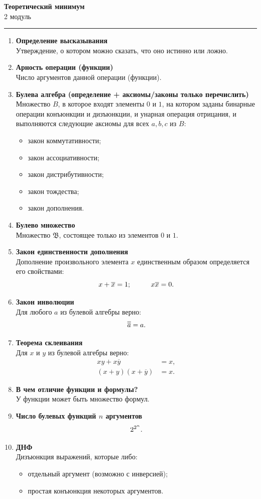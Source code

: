 \documentclass[a4paper,12pt,oneside]{article}
\newcommand{\bb}{\mathfrak{B}}
\newcommand{\NOT}[1]{\overline{#1}}
\newcommand{\BigDisp}[1]{%
\[
{\Large\displaystyle #1}
\]
}
\newcommand{\DefItem}[2]{\item \textbf{#1}\\#2}
\begin{document}
\begin{center}
    {\Large\bfseries Теоретический минимум}\\[2mm]
    {\normalsize 2 модуль \hfill}
\end{center}
\vspace{2mm}
\hrule
\vspace{4mm}

\begin{enumerate}[label=\arabic*.]

\DefItem{Определение высказывания}{Утверждение, о котором можно сказать, что оно истинно или ложно.}

\DefItem{Арность операции (функции)}{Число аргументов данной операции (функции).}

\DefItem{Булева алгебра (определение + аксиомы/законы только перечислить)}{Множество $B$, в которое входят элементы $0$ и $1$, на котором заданы бинарные операции конъюнкции и дизъюнкции, и унарная операция отрицания, и выполняются следующие аксиомы для всех $a,b,c$ из $B$:
\begin{itemize}
\item закон коммутативности;
\item закон ассоциативности;
\item закон дистрибутивности;
\item закон тождества;
\item закон дополнения.
\end{itemize}}

\DefItem{Булево множество}{Множество $\bb$, состоящее только из элементов $0$ и $1$.}

\DefItem{Закон единственности дополнения}{Дополнение произвольного элемента $x$ единственным образом определяется его свойствами:
\BigDisp{x+\NOT{x}=1;\qquad x\NOT{x}=0.}}

\DefItem{Закон инволюции}{Для любого $a$ из булевой алгебры верно:
\BigDisp{\NOT{\NOT{a}}=a.}}

\DefItem{Теорема склеивания}{Для $x$ и $y$ из булевой алгебры верно:
\[
\begin{aligned}
xy + x\overline{y} &= x,\\
(x+y)(x+\overline{y}) &= x.
\end{aligned}
\]}

\DefItem{В чем отличие функции и формулы?}{У функции может быть множество формул.}

\DefItem{Число булевых функций $n$ аргументов}{\BigDisp{2^{2^{n}}.}}

\DefItem{ДНФ}{Дизъюнкция выражений, которые либо:
\begin{itemize}
\item отдельный аргумент (возможно с инверсией);
\item простая конъюнкция некоторых аргументов.
\end{itemize}}


\end{enumerate}
\end{document}
